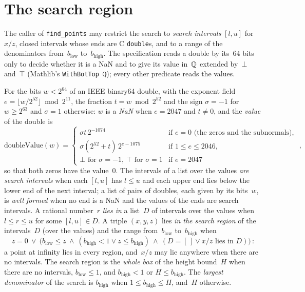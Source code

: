 \section{The search region}\label{sec:specRegion}

The caller of \verb|find_points| may restrict the search to \emph{search intervals} $[l, u]$
for~$x/z$, closed intervals whose ends are C \verb|double|s, and to a range of the denominators
from~$b_{\mathrm{low}}$ to~$b_{\mathrm{high}}$. The specification reads a double by its~$64$ bits
only to decide whether it is a NaN and to give its value in~$\mathbb{Q}$ extended by~$\bot$ and~$\top$
(Mathlib's \verb|WithBotTop ℚ|); every other predicate reads the values.

\begin{definition}\label{def:regionSpec}
  \leanok
  For the bits $w < 2^{64}$ of an IEEE binary64 double, with the exponent field
  $e = \lfloor w / 2^{52} \rfloor \bmod 2^{11}$, the fraction $t = w \bmod 2^{52}$ and the sign
  $\sigma = -1$ for $w \ge 2^{63}$ and $\sigma = 1$ otherwise: $w$ is a \emph{NaN} when $e = 2047$
  and $t \ne 0$, and the \emph{value} of the double is
  \[ \mathrm{doubleValue}(w) =
    \begin{cases}
      \sigma t\, 2^{-1074} & \text{if } e = 0 \text{ (the zeros and the subnormals)}, \\
      \sigma (2^{52} + t)\, 2^{e - 1075} & \text{if } 1 \le e \le 2046, \\
      \bot \text{ for } \sigma = -1, \ \top \text{ for } \sigma = 1 & \text{if } e = 2047
    \end{cases}\,,
  \]
  so that both zeros have the value~$0$. The intervals of a list over the values \emph{are search
  intervals} when each $[l, u]$ has $l \le u$ and each upper end lies below the lower end of the
  next interval; a list of pairs of doubles, each given by its bits~$w$, is \emph{well formed} when
  no end is a NaN and the values of the ends are search intervals. A rational number~$r$ \emph{lies in} a list~$D$ of intervals
  over the values when $l \le r \le u$ for some $[l, u] \in D$. A triple $(x, y, z)$ lies \emph{in
  the search region} of the intervals~$D$ (over the values) and the range
  from~$b_{\mathrm{low}}$ to~$b_{\mathrm{high}}$ when
  \[
    z = 0 \ \lor\ \bigl(b_{\mathrm{low}} \le z \ \land\ (b_{\mathrm{high}} < 1 \lor
      z \le b_{\mathrm{high}}) \ \land\ (D = [\,] \lor x/z \text{ lies in } D)\bigr)\,:
  \]
  a point at infinity lies in every region, and~$x/z$ may lie anywhere when there are no intervals.
  The search region is the \emph{whole box} of the height bound~$H$ when there are no intervals,
  $b_{\mathrm{low}} \le 1$, and $b_{\mathrm{high}} < 1$ or $H \le b_{\mathrm{high}}$. The
  \emph{largest denominator} of the search is $b_{\mathrm{high}}$ when $1 \le b_{\mathrm{high}} \le
  H$, and~$H$ otherwise.
\end{definition}

